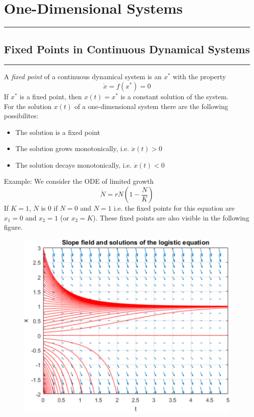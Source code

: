 \section{One-Dimensional Systems}
\noindent\rule[\linienAbstand]{\linewidth}{\linienDickeDick}

\subsection{Fixed Points in Continuous Dynamical Systems}
\noindent\rule[\linienAbstand]{\linewidth}{\linienDicke}
A \emph{fixed point} of a continuous dynamical system is an $x^*$ with the property
\begin{equation}
  \dot{x} = f(x^*) = 0
\end{equation}
If $x^*$ is a fixed point, then $x(t) = x^*$ is a constant solution of the system.\\

For the solution $x(t)$ of a one-dimensional system there are the following possibilites:
\begin{itemize}
  \item The solution is a fixed point
  \item The solution grows monotonically, i.e. $\dot{x}(t) > 0$
  \item The solution decays monotonically, i.e. $\dot{x}(t) < 0$
\end{itemize}

Example: We consider the ODE of limited growth
\begin{equation}
  \dot{N} = rN\left(1-\frac{N}{K}\right)
\end{equation}
If $K = 1$, $\dot{N}$ is $0$ if $N = 0$ and $N = 1$ i.e. the fixed points for this equation are $x_1 = 0$ and $x_2 = 1$ (or $x_2 = K$). These fixed points are also visible in the following figure.

\begin{figure}[H]
  \centering
  \includegraphics[width=.7\linewidth]{Pics/4.2.png}
\end{figure}

